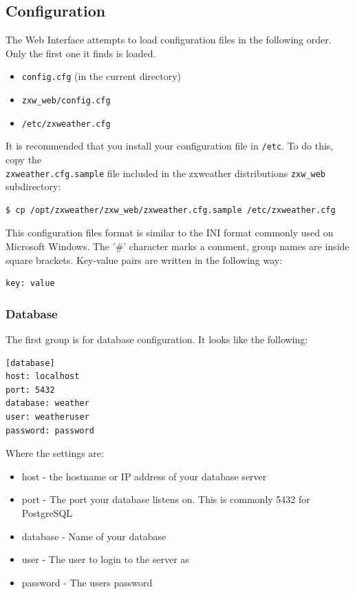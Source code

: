 \documentclass[a4paper,10pt,draft]{book}
\begin{document}
\subsection{Configuration}

The Web Interface attempts to load configuration files in the following order. Only the first one it finds is loaded.
\begin{itemize}
\item \verb|config.cfg| (in the current directory)
\item \verb|zxw_web/config.cfg|
\item \verb|/etc/zxweather.cfg|
\end{itemize}

It is recommended that you install your configuration file in \verb|/etc|. To do this, copy the \\ \verb|zxweather.cfg.sample| file included in the zxweather distributions \verb|zxw_web| subdirectory:
\begin{verbatim}
$ cp /opt/zxweather/zxw_web/zxweather.cfg.sample /etc/zxweather.cfg
\end{verbatim}

This configuration files format is similar to the INI format commonly used on Microsoft Windows. The '\#' character marks a comment, group names are inside square brackets. Key-value pairs are written in the following way:
\begin{verbatim}
key: value
\end{verbatim}

\subsubsection{Database}
The first group is for database configuration. It looks like the following:
\begin{verbatim}
[database]
host: localhost
port: 5432
database: weather
user: weatheruser
password: password
\end{verbatim}

Where the settings are:
\begin{itemize}
\item host - the hostname or IP address of your database server
\item port - The port your database listens on. This is commonly 5432 for PostgreSQL
\item database - Name of your database
\item user - The user to login to the server as
\item password - The users password
\end{itemize}
\end{document}

